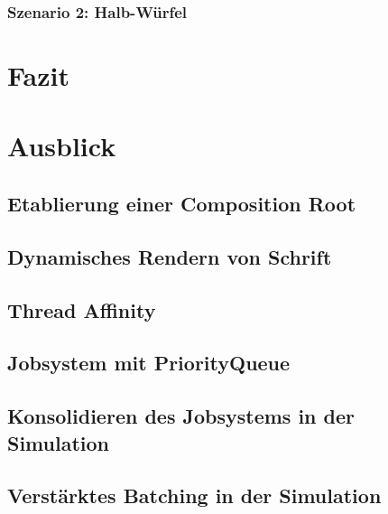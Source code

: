 \documentclass[12pt,a4paper,listof=totocnumbered,parskip=half,numbers=noenddot]{scrartcl}
\begin{document}
\subsubsection{Szenario 2: Halb-Würfel}

%
%
%

\pagebreak
\section{Fazit}
\pagebreak
\section{Ausblick}
\subsection{Etablierung einer Composition Root}

\subsection{Dynamisches Rendern von Schrift}
\subsection{Thread Affinity}
\subsection{Jobsystem mit PriorityQueue}
\subsection{Konsolidieren des Jobsystems in der Simulation}
\subsection{Verstärktes Batching in der Simulation}
\printnoidxglossaries

\pagebreak
\printbibliography[title={Literaturverzeichnis},heading=bibintoc,notkeyword=online]

\pagebreak
\printbibliography[title={Quellenverzeichnis},heading=bibintoc,keyword=online] 



\end{document}
